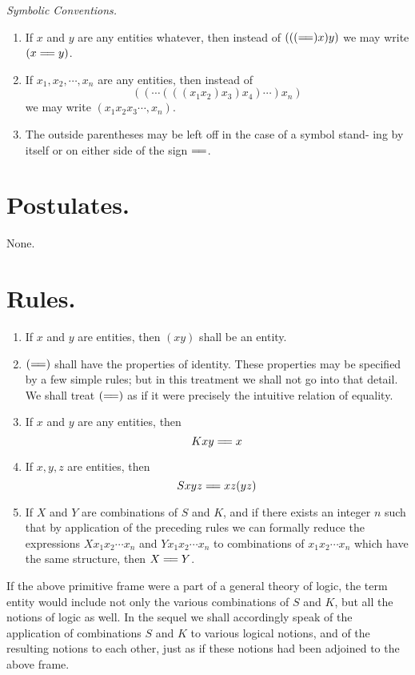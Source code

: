 \documentclass[10pt, twoside]{extarticle}
\newcommand{\td}[2][] {\todo[tickmarkheight=3pt, inline, size=\tiny, #1]{#2}}
\newcommand\longeq{=\joinrel=}
\theoremstyle{breaktheorem}
\theoremstyle{mylemma}
\theoremstyle{mydefinition}
\theoremstyle{mycorollary}
\begin{document}
\vspace{0.5em}
\noindent \textit{Symbolic Conventions.}
\td{more spacing in math/parenthesis}
\begin{enumerate}[label=\arabic*.]
\item If \(x\) and \(y\) are any entities whatever, then instead of \((((\longeq)x)y)\)
we may write \((x\longeq y)\).
\item If \(x_1, x_2, \cdots, x_n\) are any entities, then instead of
\[((\cdots (((x_1 x_2)x_3)x_4)\cdots)x_n) \]
we may write \((x_1 x_2 x_3 \cdots, x_n)\).
\item The outside parentheses may be left off in the case of a symbol stand-
ing by itself or on either side of the sign \(\longeq\).
\end{enumerate}

\section{Postulates.}
None.
\section{Rules.}

\begin{enumerate}[label=\arabic*., start=0]
\item If \(x\) and \(y\) are entities, then \((xy)\) shall be an entity.
\item \((\longeq)\) shall have the properties of identity. These properties may be
specified by a few simple rules; but in this treatment we shall not go into
that detail. We shall treat \((\longeq)\) as if it were precisely the intuitive relation
of equality.
\item If \(x\) and \(y\) are any entities, then
  \[Kxy \longeq x\]
\item If \(x,y,z\) are entities, then
  \[Sxyz \longeq xz(yz)\]
\item If \(X\) and \(Y\) are combinations of \(S\) and \(K\), and if there exists an
  integer \(n\) such that by application of the preceding rules we can formally
  reduce the expressions \(Xx_1 x_2 \cdots x_n\) and \(Yx_1 x_2 \cdots x_n\) to combinations of
  \(x_1 x_2 \cdots x_n\) which have the same structure, then \(X \longeq Y\).
\end{enumerate}

If the above primitive frame were a part of a general theory of logic, the
term entity would include not only the various combinations of \(S\) and \(K\), but
all the notions of logic as well. In the sequel we shall accordingly speak of
the application of combinations \(S\) and \(K\) to various logical notions, and of the
resulting notions to each other, just as if these notions had been adjoined to
the above frame.
\end{document}
